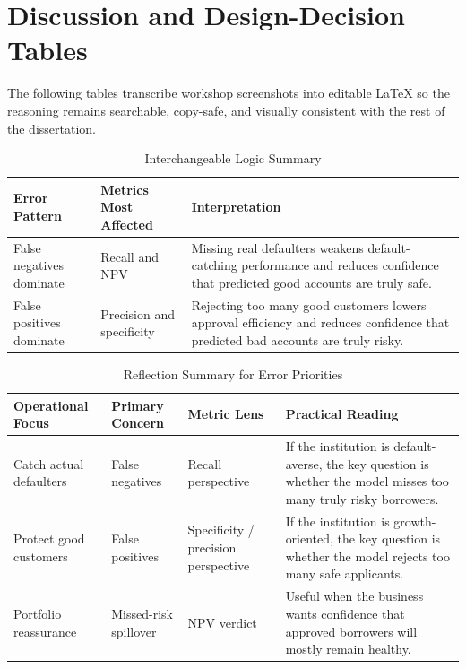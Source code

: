 \FloatBarrier

\section{Discussion and Design-Decision Tables}

The following tables transcribe workshop screenshots into editable LaTeX so the reasoning remains searchable, copy-safe, and visually consistent with the rest of the dissertation.

\begin{table}[H]
\centering
\caption{Interchangeable Logic Summary}
\label{tab:appendix_interchangeable_logic}
\begin{tabular}{p{3.2cm}p{4.2cm}p{5.7cm}}
\toprule
\textbf{Error Pattern} & \textbf{Metrics Most Affected} & \textbf{Interpretation} \\
\midrule
False negatives dominate & Recall and \ac{NPV} & Missing real defaulters weakens default-catching performance and reduces confidence that predicted good accounts are truly safe. \\
False positives dominate & Precision and specificity & Rejecting too many good customers lowers approval efficiency and reduces confidence that predicted bad accounts are truly risky. \\
\bottomrule
\end{tabular}
\end{table}

\begin{table}[H]
\centering
\caption{Reflection Summary for Error Priorities}
\label{tab:appendix_reflection_summary}
\begin{tabular}{p{3.2cm}p{3.3cm}p{3.2cm}p{4.4cm}}
\toprule
\textbf{Operational Focus} & \textbf{Primary Concern} & \textbf{Metric Lens} & \textbf{Practical Reading} \\
\midrule
Catch actual defaulters & False negatives & Recall perspective & If the institution is default-averse, the key question is whether the model misses too many truly risky borrowers. \\
Protect good customers & False positives & Specificity / precision perspective & If the institution is growth-oriented, the key question is whether the model rejects too many safe applicants. \\
Portfolio reassurance & Missed-risk spillover & \ac{NPV} verdict & Useful when the business wants confidence that approved borrowers will mostly remain healthy. \\
\bottomrule
\end{tabular}
\end{table}

